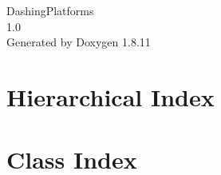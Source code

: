 \documentclass[twoside]{book}
\newcommand{\+}{\discretionary{\mbox{\scriptsize$\hookleftarrow$}}{}{}}
\newcommand{\clearemptydoublepage}{%
  \newpage{\pagestyle{empty}\cleardoublepage}%
}
\begin{document}
\begin{titlepage}
\vspace*{7cm}
\begin{center}%
{\Large Dashing\+Platforms \\[1ex]\large 1.\+0 }\\
\vspace*{1cm}
{\large Generated by Doxygen 1.8.11}\\
\end{center}
\end{titlepage}
\clearemptydoublepage
\tableofcontents
\clearemptydoublepage
{}

\chapter{Hierarchical Index}

\chapter{Class Index}

\end{document}
